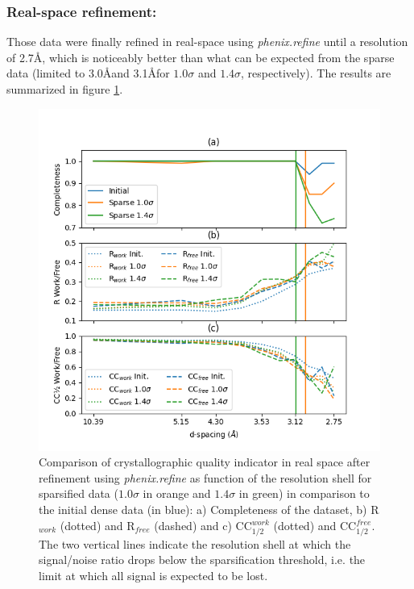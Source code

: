 \documentclass[preprint]{iucr}              %
\begin{document}
\subsubsection{Real-space refinement:}

Those data were finally refined in real-space using \textit{phenix.refine} \cite{phenix} until a resolution of 2.7\AA, which is noticeably better than what can be expected from the sparse data (limited to 3.0\AA and 3.1\AA for $1.0\sigma$ and $1.4\sigma$, respectively). 
The results are summarized in figure \ref{r-NQO1}.

\begin{figure}
\label{r-NQO1}
\includegraphics[width=12cm]{NQO1/NQO1_refine}
\caption{Comparison of crystallographic quality indicator in real space after refinement using \textit{phenix.refine} as function of the resolution shell for sparsified data ($1.0\sigma$ in orange and $1.4\sigma$ in green) in comparison to the initial dense data (in blue):
a) Completeness of the dataset, b) R$_{work}$ (dotted) and R$_{free}$ (dashed) and c) CC$_{1/2}^{work}$ (dotted) and CC$_{1/2}^{free}$.
The two vertical lines indicate the resolution shell at which the signal/noise ratio drops below the sparsification threshold, i.e. the limit at which all signal is expected to be lost.}
\end{figure}
\end{document}
